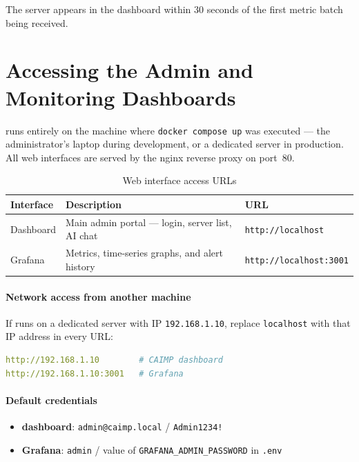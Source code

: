 \noindent The server appears in the \caimp{} dashboard within 30 seconds of the
first metric batch being received.

\section{Accessing the Admin and Monitoring Dashboards}

\caimp{} runs entirely on the machine where \texttt{docker compose up} was
executed — the administrator's laptop during development, or a dedicated server
in production. All web interfaces are served by the nginx reverse proxy on
port~80.

\begin{table}[H]
\centering
\caption{Web interface access URLs}
\label{tab:web-urls}
\begin{tabularx}{\textwidth}{lXl}
\toprule
\textbf{Interface} & \textbf{Description} & \textbf{URL} \\
\midrule
\caimp{} Dashboard & Main admin portal — login, server list, AI chat
  & \texttt{http://localhost} \\
Grafana & Metrics, time-series graphs, and alert history
  & \texttt{http://localhost:3001} \\
\bottomrule
\end{tabularx}
\end{table}

\paragraph{Network access from another machine}
If \caimp{} runs on a dedicated server with IP \texttt{192.168.1.10}, replace
\texttt{localhost} with that IP address in every URL:
\begin{lstlisting}[language=YAML]
http://192.168.1.10        # CAIMP dashboard
http://192.168.1.10:3001   # Grafana
\end{lstlisting}

\paragraph{Default credentials}
\begin{itemize}
  \item \textbf{\caimp{} dashboard}: \texttt{admin@caimp.local} /
    \texttt{Admin1234!}
  \item \textbf{Grafana}: \texttt{admin} / value of
    \texttt{GRAFANA\_ADMIN\_PASSWORD} in \texttt{.env}
\end{itemize}

